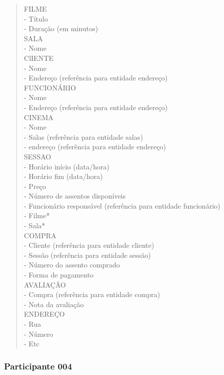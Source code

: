 \begin{quote}
FILME\\
	- Título\\
	- Duração (em minutos)\\
SALA\\
	- Nome\\
ClIENTE\\
	- Nome\\
	- Endereço (referência para entidade endereço)\\
FUNCIONÁRIO\\
	- Nome\\
	- Endereço (referência para entidade endereço)\\
CINEMA\\
	- Nome\\
    - Salas (referência para entidade salas)\\
    - endereço (referência para entidade endereço)\\
SESSAO\\
	- Horário início (data/hora)\\
    - Horário fim (data/hora)\\
    - Preço\\
    - Número de assentos disponíveis\\
    - Funcionário responsável (referência para entidade funcionário)\\
    - Filme*\\
    - Sala*\\
COMPRA\\
	- Cliente (referência para entidade cliente)\\
    - Sessão (referência para entidade sessão)\\
    - Número do assento comprado\\
    - Forma de pagamento\\
AVALIAÇÃO \\
	- Compra (referência para entidade compra)\\
	- Nota da avaliação\\
ENDEREÇO \\
	- Rua \\
    - Número \\
    - Etc \\
\end{quote}

\subsubsection{\hspace*{3pt} Participante 004}
\label{sec:participante_004}

